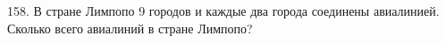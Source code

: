 158. В стране Лимпопо 9 городов и каждые два города соединены авиалинией. Сколько всего авиалиний в стране Лимпопо?\\
